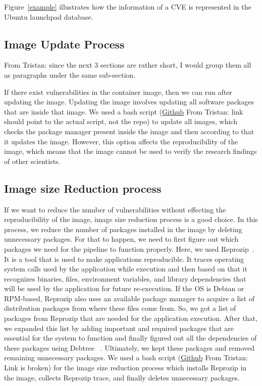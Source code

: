 \documentclass[a4paper,num-refs]{oup-contemporary}
\newcommand{\tristan}[1]{\color{blue}From Tristan: #1\color{black}}
\begin{document}
Figure~\ref{example} illustrates how the information of a CVE is represented
in the Ubuntu launchpad database.

\subsection{Image Update Process}

\tristan{since the next 3 sections are rather short, I would group them all 
as paragraphs under the same sub-section.}

If there exist vulnerabilities in the container image, then we can
run after updating the
image. Updating the image involves updating all software packages that are
inside that image. We used a bash script (\href{https://github.com/kaurbhupinder/Vulnerability-Analysis}{Github} \tristan{link should point to the actual script, not the repo}) 
to update all images, which checks the
package manager present inside the image and then according to that it
updates the image. However, this option affects the reproducibility
of the image, which means that the image cannot be used to verify the research
findings of other scientists.

\subsection{Image size Reduction process}
If we want to reduce the number of vulnerabilities without effecting the reproducibility of the image,
image size reduction process is a good choice. In this process, we reduce the number of packages
installed in the image by deleting unnecessary packages. For that to happen, we need to first figure
out which packages we need for the pipeline to function properly. Here, we used 
Reprozip~\cite{rampin2016reprozip}. It is a tool that
is used to make applications reproducible. It traces operating system calls used by the
application while execution and then based on that it recognizes binaries, files, environment variables,
and library dependencies that will be used by the application for future re-execution. If the OS is
Debian or RPM-based, Reprozip also
uses an available package manager to acquire a list of distribution packages from where these files come from.
So, we got a list of packages from Reprozip that are needed for the application execution. 
After that, we expanded this list by adding important and required packages that are essential
for the system to function and finally figured out all the dependencies of these packages using Debtree
~\cite{debtree}.
Ultimately, we kept these packages and removed remaining unnecessary packages. We used a bash script
(\href{https://github.com/kaurbhupinder/Vulnerability-Analysis/blob/master/Scripts/script.sh}{Github} \tristan{Link is broken}) for
the image size reduction process which installs Reprozip in the image, collects Reprozip trace, and
finally deletes unnecessary packages.
\end{document}
